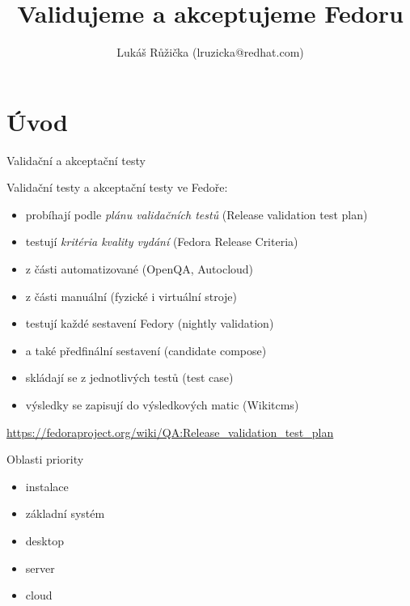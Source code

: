\documentclass[12pt,aspectratio=169]{beamer}
\begin{document}
	\author{Lukáš Růžička (lruzicka@redhat.com)}
	\title{Validujeme a akceptujeme Fedoru}
	\date{}

\begin{frame}[plain]
	\maketitle 
\end{frame}

\section{Úvod}

\begin{frame}{Validační a akceptační testy}

Validační testy a akceptační testy ve Fedoře:

\vspace{15pt}

\begin{itemize}
\item probíhají podle \textit{plánu validačních testů} (Release validation test plan)
\item testují \textit{kritéria kvality vydání} (Fedora Release Criteria)
\item z části automatizované (OpenQA, Autocloud)
\item z části manuální (fyzické i virtuální stroje)
\item testují každé sestavení Fedory (nightly validation)
\item a také předfinální sestavení (candidate compose)
\item skládají se z jednotlivých testů (test case)
\item výsledky se zapisují do výsledkových matic (Wikitcms)
\end{itemize}

\vspace{15pt}

{\small \url{https://fedoraproject.org/wiki/QA:Release_validation_test_plan}}
\end{frame}

\begin{frame}{Oblasti priority}
	
	\begin{itemize}
		\item instalace
		\item základní systém
		\item desktop
		\item server
		\item cloud
	\end{itemize}
\end{frame}
\end{document}
